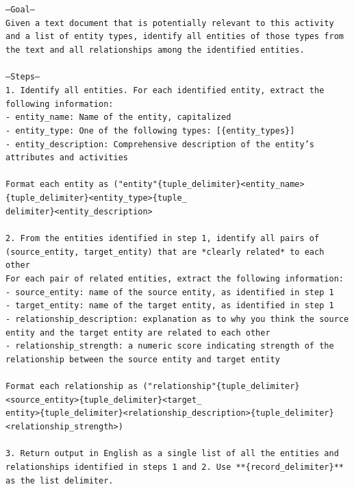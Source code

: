 \documentclass{article}
\begin{document}
\scriptsize
\texttt{---Goal---\\
Given a text document that is potentially relevant to this activity and a list of entity types, identify all entities of those types from the text and all relationships among the identified entities.\\
\\
---Steps---\\
1. Identify all entities. For each identified entity, extract the following information:\\
- entity\_name: Name of the entity, capitalized\\
- entity\_type: One of the following types: [\{entity\_types\}]\\
- entity\_description: Comprehensive description of the entity's attributes and activities\\
\\
Format each entity as ("entity"\{tuple\_delimiter\}<entity\_name>\{tuple\_delimiter\}<entity\_type>\{tuple\_\\
delimiter\}<entity\_description>\\
\\
2. From the entities identified in step 1, identify all pairs of (source\_entity, target\_entity) that are *clearly related* to each other\\
For each pair of related entities, extract the following information:\\
- source\_entity: name of the source entity, as identified in step 1\\
- target\_entity: name of the target entity, as identified in step 1\\
- relationship\_description: explanation as to why you think the source entity and the target entity are related to each other\\
- relationship\_strength: a numeric score indicating strength of the relationship between the source entity and target entity\\
\\
Format each relationship as ("relationship"\{tuple\_delimiter\}<source\_entity>\{tuple\_delimiter\}<target\_\\
entity>\{tuple\_delimiter\}<relationship\_description>\{tuple\_delimiter\}<relationship\_strength>)\\
\\
3. Return output in English as a single list of all the entities and relationships identified in steps 1 and 2. Use **\{record\_delimiter\}** as the list delimiter.\\
}
\end{document}
